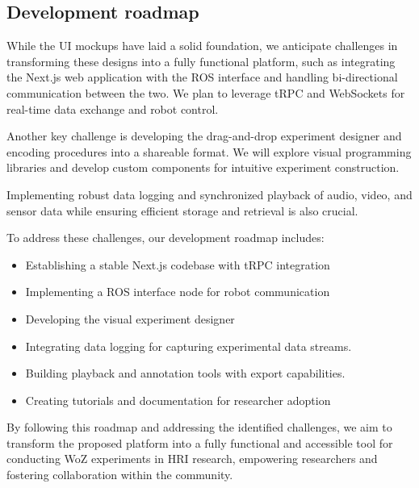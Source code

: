 \documentclass[letterpaper, 10 pt, conference]{ieeeconf}
\begin{document}
\subsection{Development roadmap}

While the UI mockups have laid a solid foundation, we anticipate challenges in transforming these designs into a fully functional platform, such as integrating the Next.js web application with the ROS interface and handling bi-directional communication between the two. We plan to leverage tRPC and WebSockets for real-time data exchange and robot control.

Another key challenge is developing the drag-and-drop experiment designer and encoding procedures into a shareable format. We will explore visual programming libraries and develop custom components for intuitive experiment construction.

Implementing robust data logging and synchronized playback of audio, video, and sensor data while ensuring efficient storage and retrieval is also crucial.

To address these challenges, our development roadmap includes:
\begin{itemize}
    \item Establishing a stable Next.js codebase with tRPC integration
    \item Implementing a ROS interface node for robot communication    
    \item Developing the visual experiment designer
    \item Integrating data logging for capturing experimental data streams.
    \item Building playback and annotation tools with export capabilities.
    \item Creating tutorials and documentation for researcher adoption
\end{itemize}

By following this roadmap and addressing the identified challenges, we aim to transform the proposed platform into a fully functional and accessible tool for conducting WoZ experiments in HRI research, empowering researchers and fostering collaboration within the community.

%
%
%



\end{document}
